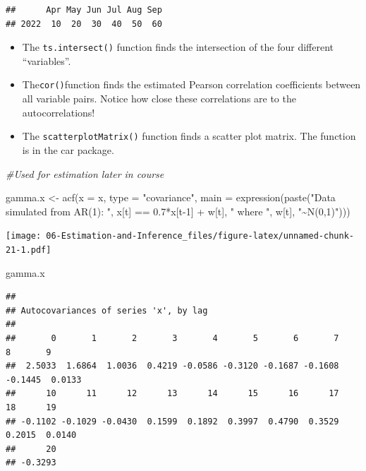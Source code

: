 \documentclass[
]{book}
\newenvironment{Shaded}{\begin{snugshade}}{\end{snugshade}}
\newcommand{\AttributeTok}[1]{\textcolor[rgb]{0.77,0.63,0.00}{#1}}
\newcommand{\CommentTok}[1]{\textcolor[rgb]{0.56,0.35,0.01}{\textit{#1}}}
\newcommand{\DecValTok}[1]{\textcolor[rgb]{0.00,0.00,0.81}{#1}}
\newcommand{\FloatTok}[1]{\textcolor[rgb]{0.00,0.00,0.81}{#1}}
\newcommand{\FunctionTok}[1]{\textcolor[rgb]{0.00,0.00,0.00}{#1}}
\newcommand{\NormalTok}[1]{#1}
\newcommand{\OtherTok}[1]{\textcolor[rgb]{0.56,0.35,0.01}{#1}}
\newcommand{\SpecialCharTok}[1]{\textcolor[rgb]{0.00,0.00,0.00}{#1}}
\newcommand{\StringTok}[1]{\textcolor[rgb]{0.31,0.60,0.02}{#1}}
\providecommand{\tightlist}{%
  \setlength{\itemsep}{0pt}\setlength{\parskip}{0pt}}
\theoremstyle{definition}
\theoremstyle{definition}
\theoremstyle{definition}
\theoremstyle{definition}
\theoremstyle{remark}
\begin{document}
\begin{verbatim}
##      Apr May Jun Jul Aug Sep
## 2022  10  20  30  40  50  60
\end{verbatim}

\begin{itemize}
\tightlist
\item
  The \texttt{ts.intersect()} function finds the intersection of the four different ``variables''.\\
\item
  The\texttt{cor()}function finds the estimated Pearson correlation coefficients between all variable pairs. Notice how close these correlations are to the autocorrelations!\\
\item
  The \texttt{scatterplotMatrix()} function finds a scatter plot matrix. The function is in the car package.
\end{itemize}

\begin{Shaded}
\begin{Highlighting}[]
\CommentTok{\#Used for estimation later in course}

\NormalTok{  gamma.x }\OtherTok{\textless{}{-}} \FunctionTok{acf}\NormalTok{(}\AttributeTok{x =}\NormalTok{ x, }\AttributeTok{type =} \StringTok{"covariance"}\NormalTok{, }\AttributeTok{main =}
    \FunctionTok{expression}\NormalTok{(}\FunctionTok{paste}\NormalTok{(}\StringTok{"Data simulated from AR(1): "}\NormalTok{, x[t] }\SpecialCharTok{==} \FloatTok{0.7}\SpecialCharTok{*}\NormalTok{x[t}\DecValTok{{-}1}\NormalTok{] }\SpecialCharTok{+}\NormalTok{ w[t], }\StringTok{" where "}\NormalTok{, w[t], }\StringTok{"\textasciitilde{}N(0,1)"}\NormalTok{)))}
\end{Highlighting}
\end{Shaded}

\texttt{[image: 06-Estimation-and-Inference\_files/figure-latex/unnamed-chunk-21-1.pdf]}

\begin{Shaded}
\begin{Highlighting}[]
\NormalTok{  gamma.x}
\end{Highlighting}
\end{Shaded}

\begin{verbatim}
## 
## Autocovariances of series 'x', by lag
## 
##       0       1       2       3       4       5       6       7       8       9 
##  2.5033  1.6864  1.0036  0.4219 -0.0586 -0.3120 -0.1687 -0.1608 -0.1445  0.0133 
##      10      11      12      13      14      15      16      17      18      19 
## -0.1102 -0.1029 -0.0430  0.1599  0.1892  0.3997  0.4790  0.3529  0.2015  0.0140 
##      20 
## -0.3293
\end{verbatim}
\end{document}
